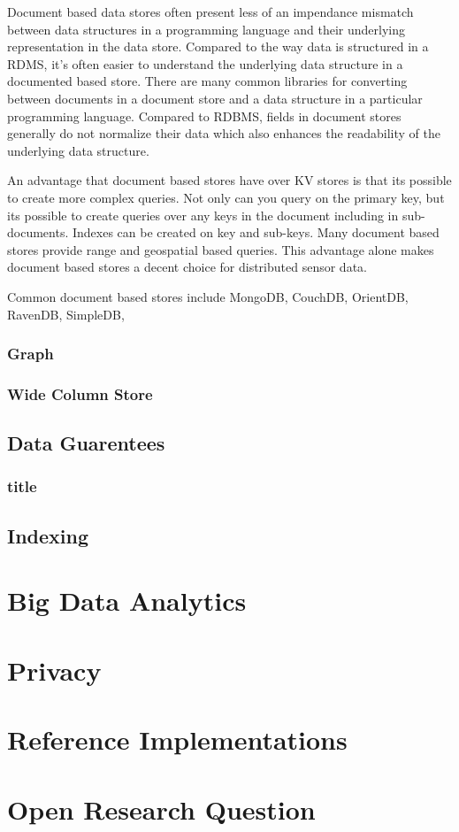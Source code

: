 \documentclass[twocolumn]{article}
\begin{document}
Document based data stores often present less of an impendance mismatch between data structures in a programming language and their underlying representation in the data store. Compared to the way data is structured in a RDMS, it's often easier to understand the underlying data structure in a documented based store. There are many common libraries for converting between documents in a document store and a data structure in a particular programming language. Compared to RDBMS, fields in document stores generally do not normalize their data which also enhances the readability of the underlying data structure\cite{ravendb}.

An advantage that document based stores have over KV stores is that its possible to create more complex queries. Not only can you query on the primary key, but its possible to create queries over any keys in the document including in sub-documents. Indexes can be created on key and sub-keys. Many document based stores provide range and geospatial based queries. This advantage alone makes document based stores a decent choice for distributed sensor data.

Common document based stores include MongoDB, CouchDB, OrientDB, RavenDB, SimpleDB, 

\subsubsection{Graph}
\subsubsection{Wide Column Store}

\subsection{Data Guarentees}
\subsubsection{title}

\subsection{Indexing}



\section{Big Data Analytics}

\section{Privacy}

\section{Reference Implementations}

\section{Open Research Question}



\end{document}
